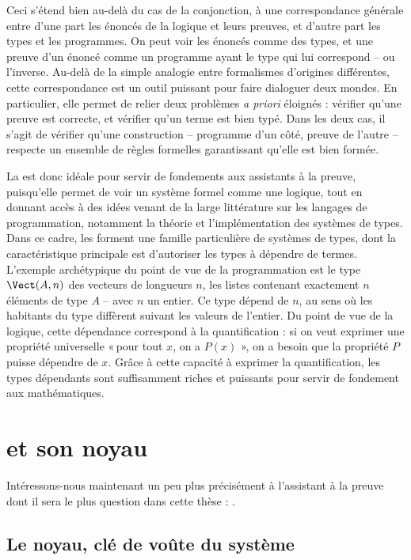 Ceci s’étend bien au-delà du cas de la conjonction,
à une correspondance générale entre d’une part les énoncés de la logique et leurs preuves,
et d’autre part les types et les programmes. On peut voir les énoncés comme des types,
et une preuve d’un énoncé comme un programme ayant le type qui lui correspond – ou l’inverse.
Au-delà de la simple analogie entre formalismes d’origines différentes, cette correspondance est un outil puissant pour faire dialoguer deux mondes.
En particulier, elle permet de relier deux problèmes \textit{a priori} éloignés :
vérifier qu’une preuve est correcte, et vérifier qu’un terme est bien typé.
Dans les deux cas, il s’agit de vérifier qu’une construction – programme d’un côté,
preuve de l’autre – respecte un ensemble de règles formelles garantissant qu’elle est
bien formée.

La  est donc idéale pour servir de fondements aux
assistants à la preuve, puisqu’elle permet de voir un système formel
comme une logique, tout en donnant accès à des idées venant de
la large littérature sur les langages de programmation, notamment
la théorie et l’implémentation des systèmes de types.
Dans ce cadre, les  
forment une famille particulière de systèmes de types, dont la
caractéristique principale est d’autoriser les types à dépendre de termes.
L’exemple archétypique du point de vue de la  programmation est le type
$\Vect(A,n)$ des vecteurs de longueurs $n$,
les listes contenant exactement $n$ éléments de type $A$ – avec $n$ un entier.
Ce type dépend de $n$, au sens où les habitants du type diffèrent suivant les valeurs de
l’entier. Du point de vue de la logique, cette
dépendance correspond à la quantification : si on veut exprimer
une propriété universelle « pour tout $x$, on a $P(x)$ », on a besoin que la propriété $P$
puisse dépendre de $x$.
Grâce à cette capacité à exprimer la quantification,
les types dépendants sont suffisamment riches et puissants pour
servir de fondement aux mathématiques.

\section{ et son noyau}
\label{sec:intro-coq}

Intéressons-nous maintenant un peu plus précisément à l’assistant à la
preuve dont il sera le plus question dans cette thèse : .

\subsection[Le noyau]{Le noyau, clé de voûte du système}

